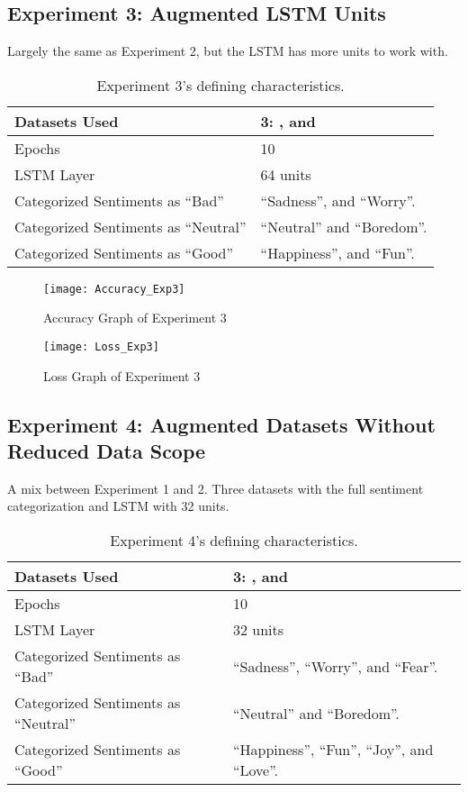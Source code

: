 \subsection{Experiment 3: Augmented LSTM Units}
\label{exp3}
Largely the same as Experiment 2, but the LSTM has more units to work with.
\begin{table}[!th]
	\caption{Experiment 3's defining characteristics.}
	\vspace{0.5cm}
	\centering
	\begin{tabular}[t]{|l|l|}
	\hline
		Datasets Used & \makecell{3: \citet{d1}, \citet{d2} and\\ \citet{d3}}
	\\ \hline
		Epochs & 10
	\\ \hline
		LSTM Layer & 64 units
	\\ \hline
		Categorized Sentiments as ``Bad'' & ``Sadness'', and ``Worry''.
	\\ \hline	
		 Categorized Sentiments as ``Neutral'' & ``Neutral'' and ``Boredom''.
	\\ \hline	
		Categorized Sentiments as ``Good'' & ``Happiness'', and ``Fun''.
	\\ \hline
	\end{tabular}
\end{table}

\begin{figure}[!h]
	\centering
	\texttt{[image: Accuracy\_Exp3]}
	\caption{Accuracy Graph of Experiment 3}
	\label{fig:accuracy_exp3}
	\texttt{[image: Loss\_Exp3]}
	\caption{Loss Graph of Experiment 3}
	\label{fig:loss_exp3}
\end{figure}
\pagebreak

\subsection{Experiment 4: Augmented Datasets Without Reduced Data Scope}
\label{exp4}
A mix between Experiment 1 and 2. Three datasets with the full sentiment categorization and LSTM with 32 units.
\begin{table}[!h]
	\caption{Experiment 4's defining characteristics.}
	\vspace{0.5cm}
	\centering
	\begin{tabular}[t]{|l|l|}
	\hline
		Datasets Used & \makecell{3: \citet{d1}, \citet{d2} and\\ \citet{d3}}
	\\ \hline
		Epochs & 10
	\\ \hline
		LSTM Layer & 32 units
	\\ \hline
		Categorized Sentiments as ``Bad'' & ``Sadness'', ``Worry'', and ``Fear''.
	\\ \hline	
		 Categorized Sentiments as ``Neutral'' & ``Neutral'' and ``Boredom''.
	\\ \hline	
		Categorized Sentiments as ``Good'' & ``Happiness'', ``Fun'', ``Joy'', and ``Love''.
	\\ \hline
	\end{tabular}
\end{table}

